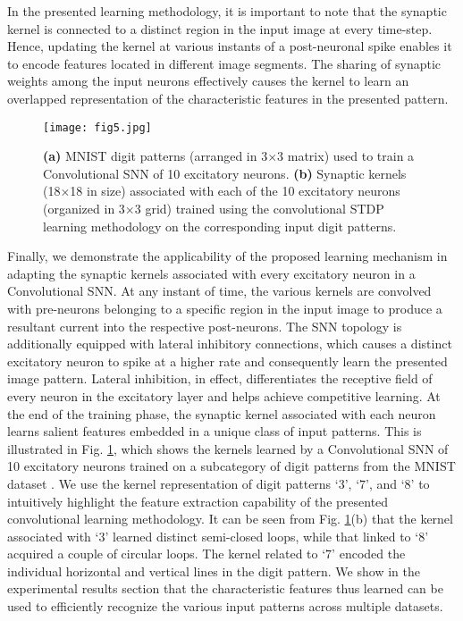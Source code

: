 \documentclass[journal, onecolumn]{IEEEtran}
\begin{document}
In the presented learning methodology, it is important to note that the synaptic kernel is connected to a distinct region in the input image at every time-step. Hence, updating the kernel at various instants of a post-neuronal spike enables it to encode features located in different image segments. The sharing of synaptic weights among the input neurons effectively causes the kernel to learn an overlapped representation of the characteristic features in the presented pattern.

\begin{figure}[!t]
\centering
\texttt{[image: fig5.jpg]}
\caption{\textbf{(a)} MNIST digit patterns (arranged in 3$\times$3 matrix) used to train a Convolutional SNN of 10 excitatory neurons. \textbf{(b)} Synaptic kernels (18$\times$18 in size) associated with each of the 10 excitatory neurons (organized in 3$\times$3 grid) trained using the convolutional STDP learning methodology on the corresponding input digit patterns.}
\label{fig:Conv_MNIST_Kernels1}
\end{figure}

Finally, we demonstrate the applicability of the proposed learning mechanism in adapting the synaptic kernels associated with every excitatory neuron in a Convolutional SNN. At any instant of time, the various kernels are convolved with pre-neurons belonging to a specific region in the input image to produce a resultant current into the respective post-neurons. The SNN topology is additionally equipped with lateral inhibitory connections, which causes a distinct excitatory neuron to spike at a higher rate and consequently learn the presented image pattern. Lateral inhibition, in effect, differentiates the receptive field of every neuron in the excitatory layer and helps achieve competitive learning. At the end of the training phase, the synaptic kernel associated with each neuron learns salient features embedded in a unique class of input patterns. This is illustrated in Fig. \ref{fig:Conv_MNIST_Kernels1}, which shows the kernels learned by a Convolutional SNN of 10 excitatory neurons trained on a subcategory of digit patterns from the MNIST dataset \cite{lecun1998mnist}. We use the kernel representation of digit patterns `$3$', `$7$', and `$8$' to intuitively highlight the feature extraction capability of the presented convolutional learning methodology. It can be seen from Fig. \ref{fig:Conv_MNIST_Kernels1}(b) that the kernel associated with `$3$' learned distinct semi-closed loops, while that linked to `$8$' acquired a couple of circular loops. The kernel related to `$7$' encoded the individual horizontal and vertical lines in the digit pattern. We show in the experimental results section that the characteristic features thus learned can be used to efficiently recognize the various input patterns across multiple datasets.
\end{document}
